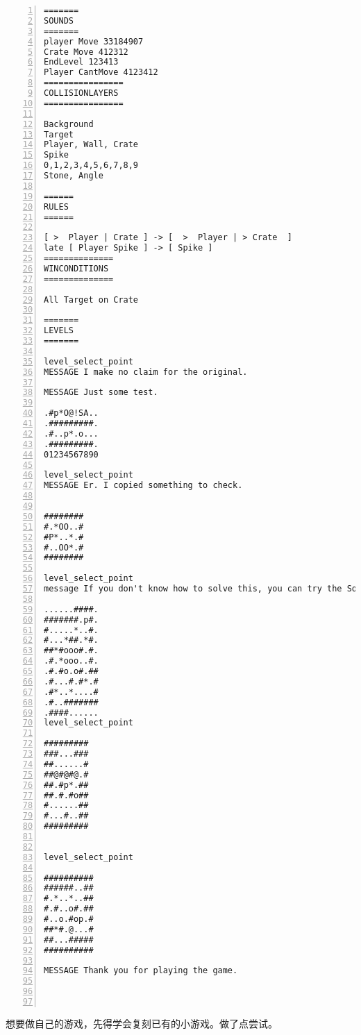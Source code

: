 \documentclass[11pt]{amsart}
\begin{document}
\begin{lstlisting}[numbers=left,numberstyle=\tiny,numbersep=10pt]
=======
SOUNDS
=======
player Move 33184907
Crate Move 412312
EndLevel 123413
Player CantMove 4123412
================
COLLISIONLAYERS
================

Background
Target
Player, Wall, Crate
Spike
0,1,2,3,4,5,6,7,8,9
Stone, Angle

======
RULES     
======     

[ >  Player | Crate ] -> [  >  Player | > Crate  ]
late [ Player Spike ] -> [ Spike ]
==============
WINCONDITIONS
==============

All Target on Crate     

=======     
LEVELS
=======

level_select_point
MESSAGE I make no claim for the original. 

MESSAGE Just some test.

.#p*O@!SA..
.#########.
.#..p*.o...
.#########.
01234567890

level_select_point
MESSAGE Er. I copied something to check.


########
#.*OO..#
#P*..*.#
#..OO*.#
########

level_select_point
message If you don't know how to solve this, you can try the SokobanAutomaticSolver:  http://m.wodown.com/soft/14821.html#downAddress

......####.
#######.p#.
#.....*..#.
#...*##.*#.
##*#ooo#.#.
.#.*ooo..#.
.#.#o.o#.##
.#...#.#*.#
.#*..*....#
.#..#######
.####......
level_select_point

#########
###...###
##......#
##@#@#@.#
##.#p*.##
##.#.#o##
#......##
#...#..##
#########


level_select_point

##########
######..##
#.*..*..##
#.#..o#.##
#..o.#op.#
##*#.@...#
##...#####
##########

MESSAGE Thank you for playing the game.




\end{lstlisting}

想要做自己的游戏，先得学会复刻已有的小游戏。做了点尝试。
\end{document}
